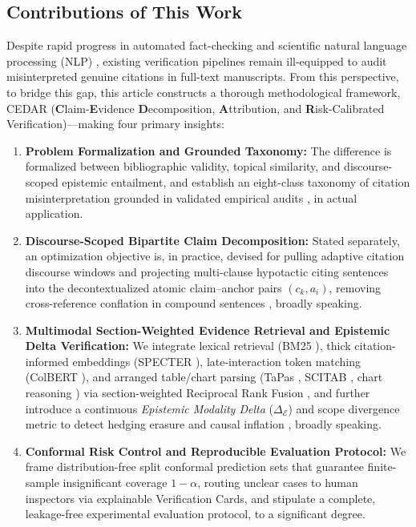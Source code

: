 \documentclass[journal]{IEEEtran}
\begin{document}
\subsection{Contributions of This Work}
Despite rapid progress in automated fact-checking \cite{thorne2018fever,zeng2021automated} and scientific natural language processing (NLP) \cite{wadden2020fact,vladika2023scientific}, existing verification pipelines remain ill-equipped to audit misinterpreted genuine citations in full-text manuscripts. From this perspective, to bridge this gap, this article constructs a thorough methodological framework, CEDAR (\textbf{C}laim-\textbf{E}vidence \textbf{D}ecomposition, \textbf{A}ttribution, and \textbf{R}isk-Calibrated Verification)---making four primary insights:
\begin{enumerate}
\item \textbf{Problem Formalization and Grounded Taxonomy:} The difference is formalized between bibliographic validity, topical similarity, and discourse-scoped epistemic entailment, and establish an eight-class taxonomy of citation misinterpretation grounded in validated empirical audits \cite{delacey1985accurate,greenberg2009citation,jergas2015quotation,mogull2017accuracy}, in actual application.
\item \textbf{Discourse-Scoped Bipartite Claim Decomposition:} Stated separately, an optimization objective is, in practice, devised for pulling adaptive citation discourse windows and projecting multi-clause hypotactic citing sentences into the decontextualized atomic claim--anchor pairs $(c_k, a_i)$, removing cross-reference conflation in compound sentences \cite{kamoi2023wice,min2023factscore}, broadly speaking.
\item \textbf{Multimodal Section-Weighted Evidence Retrieval and Epistemic Delta Verification:} We integrate lexical retrieval (BM25 \cite{robertson2009probabilistic}), thick citation-informed embeddings (SPECTER \cite{cohan2020specter}), late-interaction token matching (ColBERT \cite{khattab2020colbert}), and arranged table/chart parsing (TaPas \cite{herzig2020tapas}, SCITAB \cite{lu2023scitab}, chart reasoning \cite{akhtar2023reading}) via section-weighted Reciprocal Rank Fusion \cite{cormack2009reciprocal}, and further introduce a continuous \emph{Epistemic Modality Delta} ($\Delta_{\mathcal{E}}$) and scope divergence metric to detect hedging erasure and causal inflation \cite{hyland1998hedging}, broadly speaking.
\item \textbf{Conformal Risk Control and Reproducible Evaluation Protocol:} We frame distribution-free split conformal prediction sets \cite{sadinle2019least,angelopoulos2023conformal} that guarantee finite-sample insignificant coverage $1-\alpha$, routing unclear cases to human inspectors via explainable Verification Cards, and stipulate a complete, leakage-free experimental evaluation protocol, to a significant degree.
\end{enumerate}
\end{document}
